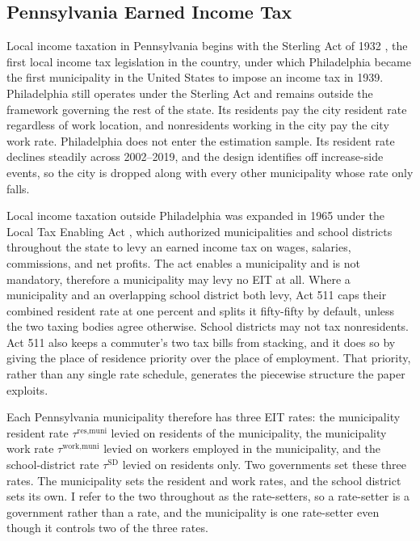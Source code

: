 \documentclass[12pt]{article}
\begin{document}
\subsection{Pennsylvania Earned Income Tax}
\label{subsec:pennsylvania}

Local income taxation in Pennsylvania begins with the Sterling Act of
1932 \citep{paSterlingAct_1932}, the first local income tax legislation
in the country, under which Philadelphia became the first municipality in
the United States to impose an income tax in 1939. Philadelphia still
operates under the Sterling Act and remains
outside the framework governing the rest of the state. Its
residents pay the city resident rate regardless of work location, and nonresidents working in the city pay the city work rate. Philadelphia does not enter the estimation sample. Its
resident rate declines steadily across 2002--2019, and the design
identifies off increase-side events, so the city is dropped along with
every other municipality whose rate only falls.

Local income taxation outside Philadelphia was expanded in 1965 under the Local Tax
Enabling Act \citep[Act 511;][]{paAct511_1965}, which authorized
municipalities and school districts throughout the state to levy
an earned income tax on wages, salaries, commissions, and net profits. The
act enables a municipality and is not mandatory, therefore a municipality may levy no EIT at
all. Where a municipality and an overlapping school district both levy,
Act 511 caps their combined resident rate at one percent and splits it
fifty-fifty by default, unless the two taxing bodies agree otherwise.
School districts may not tax nonresidents. Act 511 also
keeps a commuter's two tax bills from stacking, and it does so by giving
the place of residence priority over the place of employment. That
priority, rather than any single rate schedule, generates the piecewise
structure the paper exploits.

Each Pennsylvania municipality therefore has three EIT rates:
%
the municipality resident rate $\tau^{\text{res,muni}}$ levied on residents of the municipality, the municipality work rate $\tau^{\text{work,muni}}$ levied on workers employed in the municipality, and the school-district rate $\tau^{\text{SD}}$ levied on residents only.
Two governments set these three rates. The municipality sets the resident
and work rates, and the school district sets its own. I refer to the two
throughout as the rate-setters, so a rate-setter is a government rather
than a rate, and the municipality is one rate-setter even though it
controls two of the three rates.
\end{document}
